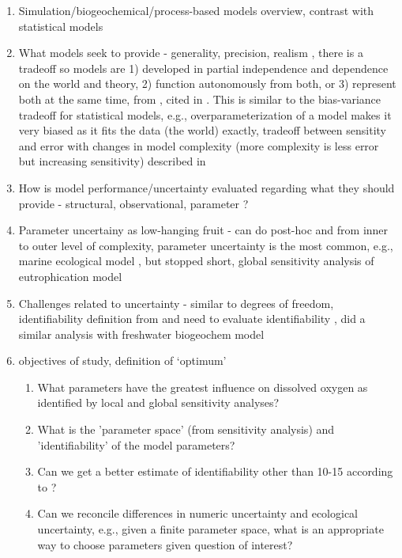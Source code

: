 \documentclass[letterpaper,12pt,oneside]{article}\usepackage[]{graphicx}\usepackage[]{color}
\begin{document}
\begin{enumerate}
\item Simulation/biogeochemical/process-based models overview, contrast with statistical models
\item What models seek to provide - generality, precision, realism \cite{Levins66}, there is a tradeoff so models are 1) developed in partial independence and dependence on the world and theory, 2) function autonomously from both, or 3) represent both at the same time, from \cite{Morrison99}, cited in \cite{Ganju16}.  This is similar to the bias-variance tradeoff for statistical models, e.g., overparameterization of a model makes it very biased as it fits the data (the world) exactly, tradeoff between sensitity and error with changes in model complexity (more complexity is less error but increasing sensitivity) described in \cite{Snowling01}
\item How is model performance/uncertainty evaluated regarding what they should provide - structural, observational, parameter \cite{Beck87}?
\item Parameter uncertainy as low-hanging fruit - can do post-hoc and from inner to outer level of complexity, parameter uncertainty is the most common, e.g., marine ecological model \cite{Mateus15}, but stopped short, global sensitivity analysis of eutrophication model \cite{Estrada10}
\item Challenges related to uncertainty - similar to degrees of freedom, identifiability definition from \cite{Brun01} and need to evaluate identifiability \cite{Fasham06}, \cite{Omlin01} did a similar analysis with freshwater biogeochem model
\item objectives of study, definition of `optimum'
\begin{enumerate}
\item What parameters have the greatest influence on dissolved oxygen as identified by local and global sensitivity analyses?
\item What is the 'parameter space' (from sensitivity analysis) and 'identifiability' of the model parameters?
\item Can we get a better estimate of identifiability other than 10-15 according to \cite{Brun01,Soetaert10}?
\item Can we reconcile differences in numeric uncertainty and ecological uncertainty, e.g., given a finite parameter space, what is an appropriate way to choose parameters given question of interest?  
\end{enumerate}
\end{enumerate}
\end{document}
